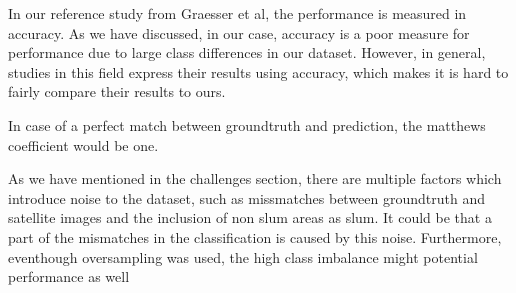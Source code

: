 In our reference study from Graesser et al, the performance is measured in accuracy. As we have discussed, in our case, accuracy is a poor measure for performance due to large class differences in our dataset. However, in general, studies in this field express their results using accuracy, which makes it is hard to fairly compare their results to ours.






In case of a perfect match between groundtruth and prediction, the matthews coefficient would be one. 




As we have mentioned in the challenges section, there are multiple factors which introduce noise to the dataset, such as missmatches between groundtruth and satellite images and the inclusion of non slum areas as slum. It could be that a part of the mismatches in the classification is caused by this noise. Furthermore, eventhough oversampling was used, the high class imbalance might potential performance as well















